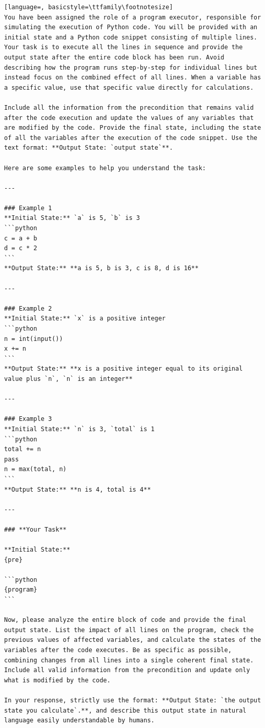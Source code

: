 \documentclass[sigconf]{acmart}
\begin{document}
\begin{tcolorbox}[ colback=gray!10, colframe=black, arc=5pt]
\begin{lstlisting}[language=, basicstyle=\ttfamily\footnotesize]
You have been assigned the role of a program executor, responsible for simulating the execution of Python code. You will be provided with an initial state and a Python code snippet consisting of multiple lines. Your task is to execute all the lines in sequence and provide the output state after the entire code block has been run. Avoid describing how the program runs step-by-step for individual lines but instead focus on the combined effect of all lines. When a variable has a specific value, use that specific value directly for calculations.

Include all the information from the precondition that remains valid after the code execution and update the values of any variables that are modified by the code. Provide the final state, including the state of all the variables after the execution of the code snippet. Use the text format: **Output State: `output state`**.

Here are some examples to help you understand the task:

---

### Example 1  
**Initial State:** `a` is 5, `b` is 3  
```python
c = a + b
d = c * 2
```
**Output State:** **a is 5, b is 3, c is 8, d is 16**

---

### Example 2  
**Initial State:** `x` is a positive integer  
```python
n = int(input())
x += n
```
**Output State:** **x is a positive integer equal to its original value plus `n`, `n` is an integer**

---

### Example 3  
**Initial State:** `n` is 3, `total` is 1  
```python
total += n
pass
n = max(total, n)
```
**Output State:** **n is 4, total is 4**

---

### **Your Task**

**Initial State:**  
{pre}

```python
{program}
```

Now, please analyze the entire block of code and provide the final output state. List the impact of all lines on the program, check the previous values of affected variables, and calculate the states of the variables after the code executes. Be as specific as possible, combining changes from all lines into a single coherent final state. Include all valid information from the precondition and update only what is modified by the code.

In your response, strictly use the format: **Output State: `the output state you calculate`.**, and describe this output state in natural language easily understandable by humans.

\end{lstlisting}
\end{tcolorbox}
\end{document}
